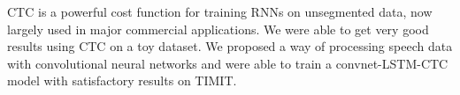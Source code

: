 \documentclass[11pt,a4paper]{article}
\providecommand*{\hr}[1][class-arg]{%
    \hspace*{\fill}\hrulefill\hspace*{\fill}
    \vskip 0.65\baselineskip
}
\begin{document}
CTC is a powerful cost function for training RNNs on unsegmented data, now largely used in major commercial applications. We were able to get very good results using CTC on a toy dataset. We proposed a way of processing speech data with convolutional neural networks and were able to train a convnet-LSTM-CTC model with satisfactory results on TIMIT.




\nocite{*}  %



\small





\end{document}
